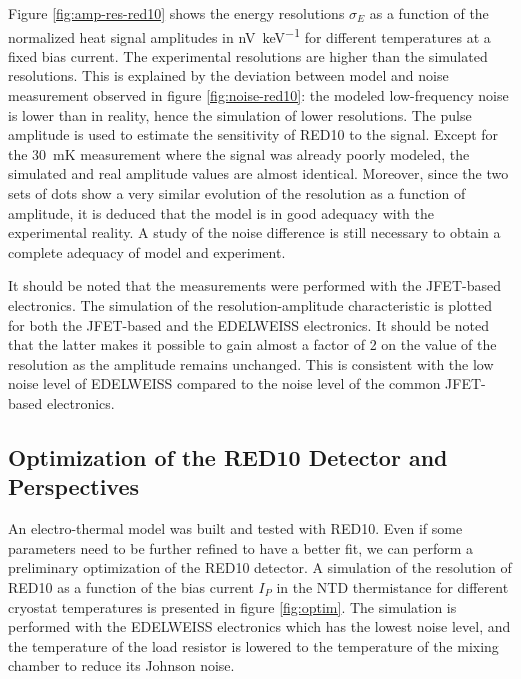 Figure \ref{fig:amp-res-red10} shows the energy resolutions $\sigma_E$ as a function of the normalized heat signal amplitudes in \si{\nano\volt\per\kilo\eV} for different temperatures at a fixed bias current. The experimental resolutions are higher than the simulated resolutions. This is explained by the deviation between model and noise measurement observed in figure \ref{fig:noise-red10}: the modeled low-frequency noise is lower than in reality, hence the simulation of lower resolutions. The pulse amplitude is used to estimate the sensitivity of RED10 to the signal. Except for the \SI{30}{\milli\kelvin} measurement where the signal was already poorly modeled, the simulated and real amplitude values are almost identical. Moreover, since the two sets of dots show a very similar evolution of the resolution as a function of amplitude, it is deduced that the model is in good adequacy with the experimental reality. A study of the noise difference is still necessary to obtain a complete adequacy of model and experiment.

It should be noted that the measurements were performed with the JFET-based electronics. The simulation of the resolution-amplitude characteristic is plotted for both the JFET-based and the EDELWEISS electronics. It should be noted that the latter makes it possible to gain almost a factor of 2 on the value of the resolution as the amplitude remains unchanged. This is consistent with the low noise level of EDELWEISS compared to the noise level of the common JFET-based electronics.


\subsection{Optimization of the RED10 Detector and Perspectives}

An electro-thermal model was built and tested with RED10. Even if some parameters need to be further refined to have a better fit, we can perform a preliminary optimization of the RED10 detector. A simulation of the resolution of RED10 as a function of the bias current $I_P$ in the NTD thermistance for different cryostat temperatures is presented in figure \ref{fig:optim}. The simulation is performed with the EDELWEISS electronics which has the lowest noise level, and the temperature of the load resistor is lowered to the temperature of the mixing chamber to reduce its Johnson noise.

